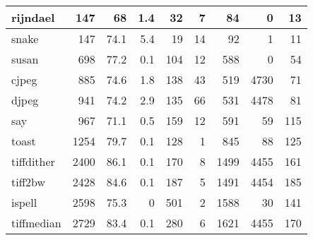 \begin{tabular}{|l|r|r|r|r|r|r|r|r|}
\hline
 rijndael        &      147 &     68   &    1.4 &   32 &    7 &     84 &     0 &    13 \\
\hline
 snake           &      147 &     74.1 &    5.4 &   19 &   14 &     92 &     1 &    11 \\
\hline
 susan           &      698 &     77.2 &    0.1 &  104 &   12 &    588 &     0 &    54 \\
\hline
 cjpeg           &      885 &     74.6 &    1.8 &  138 &   43 &    519 &  4730 &    71 \\
\hline
 djpeg           &      941 &     74.2 &    2.9 &  135 &   66 &    531 &  4478 &    81 \\
\hline
 say             &      967 &     71.1 &    0.5 &  159 &   12 &    591 &    59 &   115 \\
\hline
 toast           &     1254 &     79.7 &    0.1 &  128 &    1 &    845 &    88 &   125 \\
\hline
 tiffdither      &     2400 &     86.1 &    0.1 &  170 &    8 &   1499 &  4455 &   161 \\
\hline
 tiff2bw         &     2428 &     84.6 &    0.1 &  187 &    5 &   1491 &  4454 &   185 \\
\hline
 ispell          &     2598 &     75.3 &    0   &  501 &    2 &   1588 &    30 &   141 \\
\hline
 tiffmedian      &     2729 &     83.4 &    0.1 &  280 &    6 &   1621 &  4455 &   170 \\
\hline
\end{tabular}

